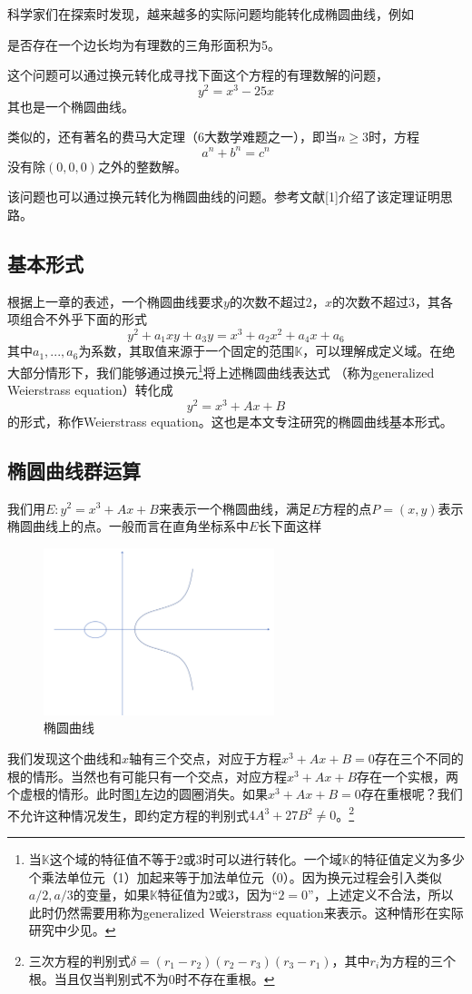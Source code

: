 \documentclass[12pt]{article}
\newcommand{\ec}{椭圆曲线}
\begin{document}
科学家们在探索时发现，越来越多的实际问题均能转化成\ec ，例如

是否存在一个边长均为有理数的三角形面积为5。

这个问题可以通过换元转化成寻找下面这个方程的有理数解的问题，
$$y^2=x^3-25x$$
其也是一个椭圆曲线。

类似的，还有著名的费马大定理（6大数学难题之一），即当$n\geq 3$时，方程
$$a^n+b^n = c^n$$
没有除$(0,0,0)$之外的整数解。

该问题也可以通过换元转化为\ec 的问题。参考文献[1]介绍了该定理证明思路。
\subsection{基本形式}
根据上一章的表述，一个椭圆曲线要求$y$的次数不超过2，$x$的次数不超过3，其各项组合不外乎下面的形式
$$ y^2+a_1xy+a_3y=x^3+a_2x^2+a_4x+a_6$$
其中$a_1,...,a_6$为系数，其取值来源于一个固定的范围$\mathbb{K}$，可以理解成定义域。在绝大部分情形下，我们能够通过换元\footnote{当$\mathbb{K}$这个域的特征值不等于2或3时可以进行转化。一个域$\mathbb{K}$的特征值定义为多少个乘法单位元（1）加起来等于加法单位元（0）。因为换元过程会引入类似$a/2,a/3$的变量，如果$\mathbb{K}$特征值为2或3，因为“$2=0$”，上述定义不合法，所以此时仍然需要用称为generalized Weierstrass equation来表示。这种情形在实际研究中少见。}将上述\ec 表达式 （称为generalized Weierstrass equation）转化成
$$y^2=x^3+Ax+B$$
的形式，称作Weierstrass equation。这也是本文专注研究的椭圆曲线基本形式。
\subsection{\ec 群运算}
我们用$E:y^2=x^3+Ax+B$来表示一个椭圆曲线，满足$E$方程的点$P=(x,y)$表示椭圆曲线上的点。一般而言在直角坐标系中$E$长下面这样
\begin{figure}[H]
	\centering
	\label{fig:ecshape}
	\includegraphics[width=0.6\textwidth]{../common/ecshape.png}
	\caption{\ec}
\end{figure}
我们发现这个曲线和$x$轴有三个交点，对应于方程$x^3+Ax+B=0$存在三个不同的根的情形。当然也有可能只有一个交点，对应方程$x^3+Ax+B$存在一个实根，两个虚根的情形。此时图\ref{fig:ecshape}左边的圆圈消失。如果$x^3+Ax+B=0$存在重根呢？我们不允许这种情况发生，即约定方程的判别式$4A^3+27B^2 \neq 0$。\footnote{三次方程的判别式$\delta=(r_1-r_2)(r_2-r_3)(r_3-r_1)$，其中$r_i$为方程的三个根。当且仅当判别式不为0时不存在重根。}
\end{document}
